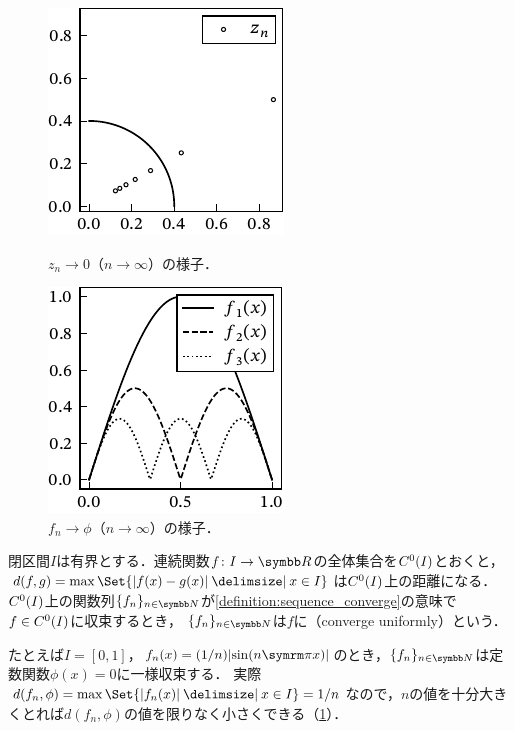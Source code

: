 \documentclass[../../main]{subfiles}
\begin{document}
\begin{figure}[htbp]
  \begin{minipage}{0.5\linewidth}
    \centering
    \includegraphics{complex_convergence.pdf}
    \caption{\(z_n\to 0\)（\(n\to\infty\)）の様子．}
    \label{figure:sequence_converge}
  \end{minipage}%
  \begin{minipage}{0.5\linewidth}
    \centering
    \includegraphics{func_convergence.pdf}
    \caption{\(f_n\to\phi\)（\(n\to\infty\)）の様子．}
    \label{figure:uniform_converge}
  \end{minipage}
\end{figure}

\begin{example}[一様収束]
  \label{example:uniform_converge}
  閉区間\(I\)は有界とする．連続関数\(f\colon I\to\numset{R}\)の全体集合を\(C^0(I)\)とおくと，\(d(f,g)=\max\Set{\abs{f(x)-g(x)}\given x\in I}\)は\(C^0(I)\)上の距離になる．
  \(C^0(I)\)上の関数列\(\seq{f_n}_{n\in\numset{N}}\)が\cref{definition:sequence_converge}の意味で\(f\in C^0(I)\)に収束するとき，
  \(\seq{f_n}_{n\in\numset{N}}\)は\(f\)に（converge uniformly）という．

  たとえば\(I=[0,1]\)，\(f_n(x)=(1/n)\abs{\sin(n\krez x)}\)のとき，\(\seq{f_n}_{n\in\numset{N}}\)は定数関数\(\phi(x)=0\)に一様収束する．
  実際\(d(f_n,\phi)=\max\Set{\abs{f_n(x)}\given x\in I}=1/n\)なので，\(n\)の値を十分大きくとれば\(d(f_n,\phi)\)の値を限りなく小さくできる（\cref{figure:uniform_converge}）．
\end{example}
\end{document}
